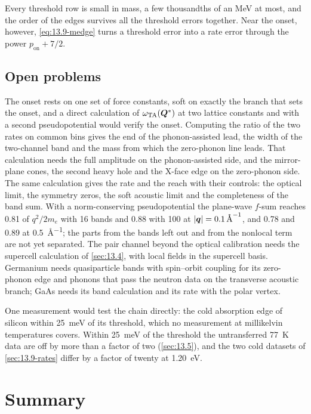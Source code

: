 Every threshold row is small in mass, a few thousandths of an MeV at most, and the order of the edges survives all the threshold errors together. Near the onset, however, \cref{eq:13.9-medge} turns a threshold error into a rate error through the power $p_{\mathrm{on}} + 7/2$.

\subsection{Open problems}\label{sec:13.9-open}

The onset rests on one set of force constants, soft on exactly the branch that sets the onset, and a direct calculation of $\omega_{\mathrm{TA}}(\bm{Q}^*)$ at two lattice constants and with a second pseudopotential would verify the onset. Computing the ratio of the two rates on common bins gives the end of the phonon-assisted lead, the width of the two-channel band and the mass from which the zero-phonon line leads. That calculation needs the full amplitude on the phonon-assisted side, and the mirror-plane cones, the second heavy hole and the X-face edge on the zero-phonon side. The same calculation gives the rate and the reach with their controls: the optical limit, the symmetry zeros, the soft acoustic limit and the completeness of the band sum. With a norm-conserving pseudopotential the plane-wave $f$-sum reaches 0.81 of $q^2/2m_e$ with 16 bands and 0.88 with 100 at $|\bm{q}| = \SI{0.1}{\angstrom^{-1}}$, and 0.78 and 0.89 at \SI{0.5}{\angstrom^{-1}}; the parts from the bands left out and from the nonlocal term are not yet separated. The pair channel beyond the optical calibration needs the supercell calculation of \cref{sec:13.4}, with local fields in the supercell basis. Germanium needs quasiparticle bands with spin--orbit coupling for its zero-phonon edge and phonons that pass the neutron data on the transverse acoustic branch; GaAs needs its band calculation and its rate with the polar vertex.

One measurement would test the chain directly: the cold absorption edge of silicon within \SI{25}{meV} of its threshold, which no measurement at millikelvin temperatures covers. Within \SI{25}{meV} of the threshold the untransferred \SI{77}{K} data are off by more than a factor of two (\cref{sec:13.5}), and the two cold datasets of \cref{sec:13.9-rates} differ by a factor of twenty at \SI{1.20}{eV}.

\section*{Summary}


